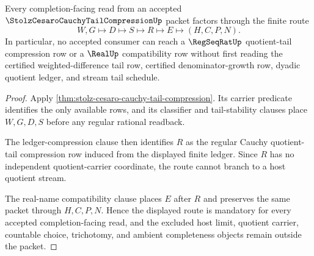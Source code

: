 \begin{theorem}
\label{thm:stolz-cesaro-cauchy-tail-compression-nonescape}
Every completion-facing read from an accepted $\StolzCesaroCauchyTailCompressionUp$ packet factors through the finite route
$$
W,G\longmapsto D\longmapsto S\longmapsto R\longmapsto E\longmapsto(H,C,P,N).
$$
In particular, no accepted consumer can reach a $\RegSeqRatUp$ quotient-tail compression row or a $\RealUp$ compatibility row without first reading the certified weighted-difference tail row, certified denominator-growth row, dyadic quotient ledger, and stream tail schedule.
\end{theorem}
\begin{proof}
Apply \autoref{thm:stolz-cesaro-cauchy-tail-compression}. Its carrier predicate identifies the only available rows, and its classifier and tail-stability clauses place $W,G,D,S$ before any regular rational readback.

The ledger-compression clause then identifies $R$ as the regular Cauchy quotient-tail compression row induced from the displayed finite ledger. Since $R$ has no independent quotient-carrier coordinate, the route cannot branch to a host quotient stream.

The real-name compatibility clause places $E$ after $R$ and preserves the same packet through $H,C,P,N$. Hence the displayed route is mandatory for every accepted completion-facing read, and the excluded host limit, quotient carrier, countable choice, trichotomy, and ambient completeness objects remain outside the packet.
\end{proof}



